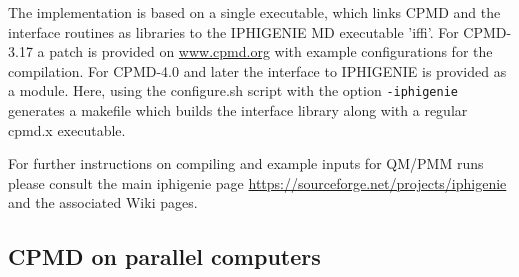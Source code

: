 \documentclass[twoside,10pt,titlepage,a4paper]{article}
\begin{document}
The implementation is based on a single executable, which links
CPMD and the interface routines as libraries to the IPHIGENIE MD executable 'iffi'.
For CPMD-3.17 a patch is provided on \url{www.cpmd.org} with example configurations 
for the compilation. For CPMD-4.0 and later the interface to IPHIGENIE is provided as a module.
Here, using the configure.sh script with the option {\tt -iphigenie}  generates
a makefile which builds the interface library along with a regular cpmd.x executable.

For further instructions on compiling and example inputs for QM/PMM runs please consult
the main iphigenie page \url{https://sourceforge.net/projects/iphigenie} and the
associated Wiki pages.

\subsection{CPMD on parallel computers}
\end{document}
